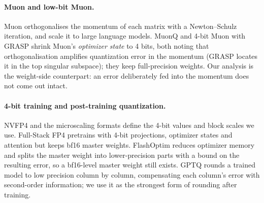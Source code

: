 \documentclass[11pt]{article}
\begin{document}
\paragraph{Muon and low-bit Muon.} Muon \citep{jordan2024muon} orthogonalises the momentum of each matrix with a
Newton--Schulz iteration, and \citet{liu2025moonlight} scale it to large language models. MuonQ \citep{su2026muonq}
and 4-bit Muon with GRASP \citep{wu2026grasp} shrink Muon's \emph{optimizer state} to 4 bits, both noting that
orthogonalisation amplifies quantization error in the momentum (GRASP locates it in the top singular subspace); they
keep full-precision weights. Our analysis is the weight-side counterpart: an error deliberately fed into the momentum
does not come out intact.

\paragraph{4-bit training and post-training quantization.} NVFP4 \citep{nvidia2025nvfp4} and the microscaling formats
\citep{rouhani2023mx} define the 4-bit values and block scales we use. Full-Stack FP4 \citep{ding2026fullstackfp4}
pretrains with 4-bit projections, optimizer states and attention but keeps bf16 master weights. FlashOptim
\citep{gonzalezortiz2026flashoptim} reduces optimizer memory and splits the master weight into lower-precision parts
with a bound on the resulting error, so a bf16-level master weight still exists. GPTQ \citep{frantar2023gptq} rounds a
trained model to low precision column by column, compensating each column's error with second-order information; we
use it as the strongest form of rounding after training.
\end{document}
